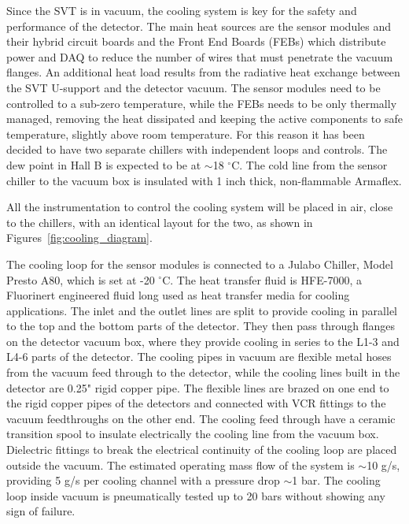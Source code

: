 \documentclass[12pt]{report}
\begin{document}
Since the SVT is in vacuum, the cooling system is key for the safety and performance of the detector. The main heat sources are the sensor modules and their hybrid circuit boards and the Front End Boards (FEBs) which distribute power and DAQ to reduce the number of wires that must penetrate the vacuum flanges. An additional heat load results from the radiative heat exchange between the SVT U-support and the detector vacuum. The sensor modules need to be controlled to a sub-zero temperature, while the FEBs needs to be only thermally managed, removing the heat dissipated and keeping the active components to safe temperature, slightly above room temperature. For this reason it has been decided to have two separate chillers with independent loops and controls. The dew point in Hall B is expected to be at $\sim$18 $^\circ$C. The cold line from the sensor chiller to the vacuum box is insulated with 1 inch thick, non-flammable Armaflex.

All the instrumentation to control the cooling system will be placed in air, close to the chillers, with an identical layout for the two, as shown in Figures~\ref{fig:cooling_diagram}. 

The cooling loop for the sensor modules is connected to a Julabo Chiller, Model Presto A80, which is set at -20 $^\circ$C. The heat transfer fluid is HFE-7000, a Fluorinert engineered fluid long used as heat transfer media for cooling applications.
The inlet and the outlet lines are split to provide cooling in parallel to the top and the bottom parts of the detector.
They then pass through flanges on the detector vacuum box, where they provide cooling in series to the L1-3 and L4-6 parts of the detector. The cooling pipes in vacuum are flexible metal hoses from the vacuum feed through to the detector, while the cooling lines built in the detector are 0.25" rigid copper pipe. The flexible lines are brazed on one end to the rigid copper pipes of the detectors and connected with VCR fittings to the vacuum feedthroughs on the other end. The cooling feed through have a ceramic transition spool to insulate electrically the cooling line from the vacuum box. Dielectric fittings to break the electrical continuity of the cooling loop are placed outside the vacuum.
The estimated operating mass flow of the system is $\sim$10 g/s, providing 5 g/s per cooling channel with a pressure drop $\sim$1 bar.  The cooling loop inside vacuum is pneumatically tested up to 20 bars without showing any sign of failure.
\end{document}

